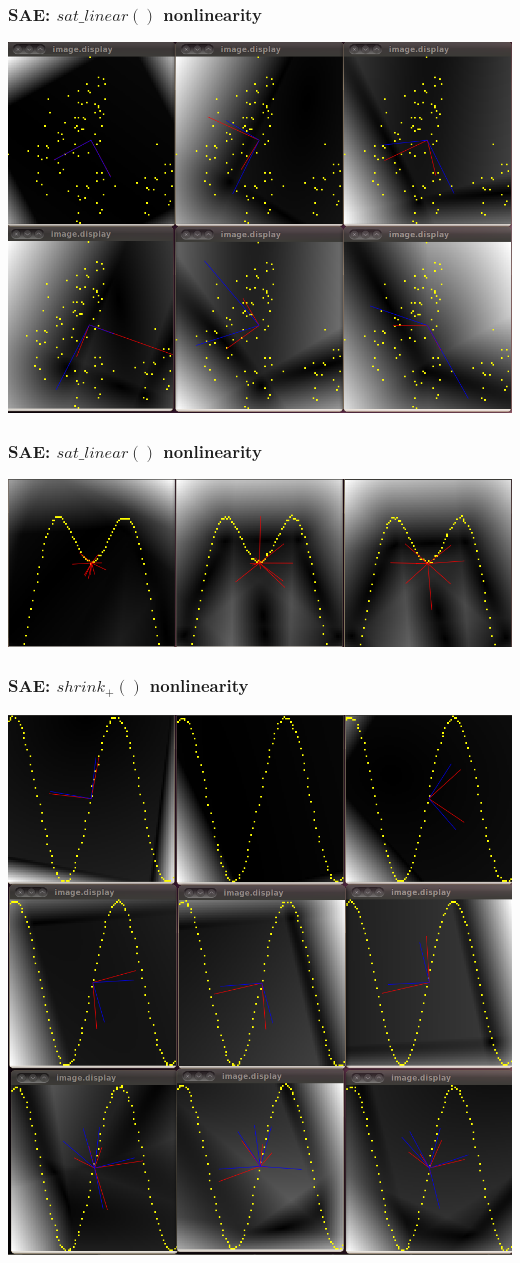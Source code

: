 \documentclass{beamer}
\begin{document}
\begin{frame}
\frametitle{SAE: $sat\_linear()$ nonlinearity} 
\begin{center}
\includegraphics[scale = 0.3]{sat_linear_scatter.png}
\end{center} 
\end{frame} 

\begin{frame}
\frametitle{SAE: $sat\_linear()$ nonlinearity} 
\begin{center}
\includegraphics[scale = 0.3]{sat_linear_M.png}
\end{center} 
\end{frame} 

\begin{frame}
\frametitle{SAE: $shrink_+()$ nonlinearity} 
\begin{center}
\includegraphics[scale = 0.20]{ramp.png}
\end{center} 
\end{frame} 
\end{document}
